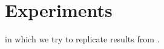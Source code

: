 \chapter{Experiments}\label{chapter:experiments}
in which we try to replicate results from \cite{belkina19}. 